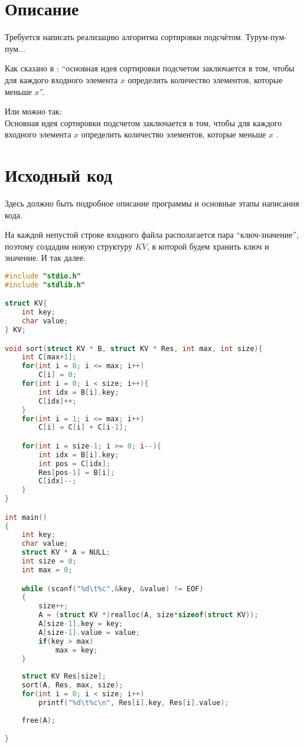 \section{Описание}
Требуется написать реализацию алгоритма сортировки подсчётом. Турум-пум-пум...

Как сказано в \cite{Kormen}: \enquote{основная идея сортировки подсчетом заключается в том, чтобы для каждого входного 
элемента $x$ определить количество элементов, которые меньше $x$}.

Или можно так:\\
Основная идея сортировки подсчетом заключается в том, чтобы для каждого входного 
элемента $x$ определить количество элементов, которые меньше $x$ \cite{Kormen}.

\pagebreak

\section{Исходный код}
Здесь должно быть подробное описание программы и основные этапы написания кода.

На каждой непустой строке входного файла располагается пара \enquote{ключ-значение}, поэтому создадим новую 
структуру $KV$, в которой будем хранить ключ и значение. И так далее.

\begin{lstlisting}[language=C]
#include "stdio.h"
#include "stdlib.h"

struct KV{
	int key;
	char value;
} KV;

void sort(struct KV * B, struct KV * Res, int max, int size){
	int C[max+1];
	for(int i = 0; i <= max; i++)
		C[i] = 0;
	for(int i = 0; i < size; i++){
		int idx = B[i].key;
		C[idx]++;
	}
	for(int i = 1; i <= max; i++)
		C[i] = C[i] + C[i-1];

	for(int i = size-1; i >= 0; i--){
		int idx = B[i].key;
		int pos = C[idx];
		Res[pos-1] = B[i];
		C[idx]--;
	}
}

int main()
{
	int key;
	char value;
	struct KV * A = NULL;
	int size = 0;
	int max = 0;

	while (scanf("%d\t%c",&key, &value) != EOF)
	{
		size++;
		A = (struct KV *)realloc(A, size*sizeof(struct KV));
		A[size-1].key = key;
		A[size-1].value = value;
		if(key > max)
			max = key;
	}
	
	struct KV Res[size];
	sort(A, Res, max, size);
	for(int i = 0; i < size; i++)
		printf("%d\t%c\n", Res[i].key, Res[i].value);
	    
    free(A);

}
	
\end{lstlisting}

